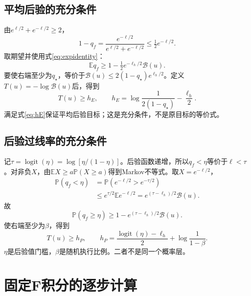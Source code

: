 \documentclass[UTF8,11pt,a4paper,fontset=fandol]{ctexart}
\newcommand{\E}{\mathbb E}
\newcommand{\Prob}{\mathbb P}
\newcommand{\logit}{\operatorname{logit}}
\numberwithin{equation}{section}
\begin{document}
\subsection{平均后验的充分条件}
由$e^{\ell/2}+e^{-\ell/2}\ge2$，
\begin{equation}
1-q_f=\frac{e^{-\ell/2}}{e^{\ell/2}+e^{-\ell/2}}
\le\tfrac12e^{-\ell/2}.
\end{equation}
取期望并使用式\eqref{eq:expidentity}：
\begin{equation}
\boxed{\E q_f\ge1-\tfrac12e^{-\ell_h/2}\mathcal B(u).}
\label{eq:meanbound}
\end{equation}
要使右端至少为$q_\star$，等价于$\mathcal B(u)\le2(1-q_\star)e^{\ell_h/2}$。定义$T(u)=-\log\mathcal B(u)$后，得到
\begin{equation}
\boxed{T(u)\ge h_E,
\qquad h_E=\log\frac{1}{2(1-q_\star)}-\frac{\ell_h}{2}.}
\label{eq:hE}
\end{equation}
满足式\eqref{eq:hE}保证平均后验目标；这是充分条件，不是原目标的等价式。

\subsection{后验过线率的充分条件}
记$\tau=\logit(\eta)=\log[\eta/(1-\eta)]$。后验函数递增，所以$q_f<\eta$等价于$\ell<\tau$。对非负$X$，由$\E X\ge a\Prob(X\ge a)$得到Markov不等式。取$X=e^{-\ell/2}$，
\begin{align}
\Prob(q_f<\eta)
&=\Prob(e^{-\ell/2}>e^{-\tau/2})\\
&\le e^{\tau/2}\E e^{-\ell/2}
=e^{(\tau-\ell_h)/2}\mathcal B(u).
\end{align}
故
\begin{equation}
\boxed{\Prob(q_f\ge\eta)\ge1-e^{(\tau-\ell_h)/2}\mathcal B(u).}
\label{eq:eventbound}
\end{equation}
使右端至少为$\beta$，得到
\begin{equation}
\boxed{T(u)\ge h_P,
\qquad h_P=\frac{\logit(\eta)-\ell_h}{2}+\log\frac{1}{1-\beta}.}
\label{eq:hP}
\end{equation}
$\eta$是后验值门槛，$\beta$是随机执行比例。二者不是同一个概率层。

\section{固定F积分的逐步计算}
\label{sec:integral}
\end{document}
